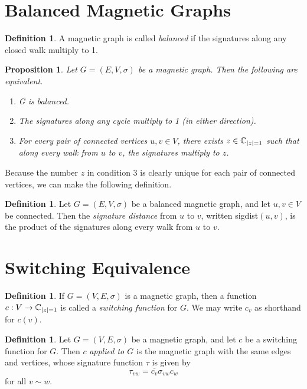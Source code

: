 \documentclass[12pt]{article}
\newtheorem{prop}[thm]{Proposition}
\theoremstyle{definition}
\newtheorem{defn}[thm]{Definition}
\newcommand{\C}{\mathbb C}
\DeclarePairedDelimiter\abs{\lvert}{\rvert}%
\begin{document}
\section{Balanced Magnetic Graphs}

\begin{defn}
A magnetic graph is called \textit{balanced} if the signatures along any closed walk multiply to 1.
\end{defn}

\begin{prop}\label{equivalent conditions for balancedness}
Let $G=(E, V, \sigma)$ be a magnetic graph. Then the following are equivalent.
\begin{enumerate}
\item G is balanced.
\item The signatures along any cycle multiply to 1 (in either direction).
\item For every pair of connected vertices $u, v \in V$, there exists $z \in \C_{\abs*{z}=1}$ such that along every walk from $u$ to $v$, the signatures multiply to $z$. 
\end{enumerate}
\end{prop}

Because the number $z$ in condition 3 is clearly unique for each pair of connected vertices, we can make the following definition.

\begin{defn}
Let $G=(E,V, \sigma)$ be a balanced magnetic graph, and let $u, v \in V$ be connected. Then the \textit{signature distance} from $u$ to $v$, written sigdist$(u, v)$, is the product of the signatures along every walk from $u$ to $v$.
\end{defn}

\section{Switching Equivalence}

\begin{defn}
If $G=(V, E, \sigma)$ is a magnetic graph, then a function $c: V \rightarrow \C_{\abs*{z}=1}$ is called a \textit{switching function} for $G$. We may write $c_v$ as shorthand for $c(v)$.
\end{defn}

\begin{defn}
Let $G = (V, E, \sigma)$ be a magnetic graph, and let $c$ be a switching function for $G$. Then $c$ \textit{applied to $G$} is the magnetic graph with the same edges and vertices, whose signature function $\tau$ is given by
$$\tau_{vw} = \overline{c_v}\sigma_{vw}c_w$$
for all $v \sim w$.
\end{defn}
\end{document}
